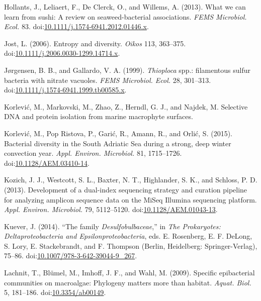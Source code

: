\documentclass[12pt,]{article}
\begin{document}
\leavevmode\hypertarget{ref-Hollants2013}{}%
Hollants, J., Leliaert, F., De Clerck, O., and Willems, A. (2013). What
we can learn from sushi: A review on seaweed-bacterial associations.
\emph{FEMS Microbiol. Ecol.} 83.
doi:\href{https://doi.org/10.1111/j.1574-6941.2012.01446.x}{10.1111/j.1574-6941.2012.01446.x}.

\leavevmode\hypertarget{ref-Jost2006}{}%
Jost, L. (2006). Entropy and diversity. \emph{Oikos} 113, 363--375.
doi:\href{https://doi.org/10.1111/j.2006.0030-1299.14714.x}{10.1111/j.2006.0030-1299.14714.x}.

\leavevmode\hypertarget{ref-Jorgensen1999}{}%
Jørgensen, B. B., and Gallardo, V. A. (1999). \emph{Thioploca} spp.:
filamentous sulfur bacteria with nitrate vacuoles. \emph{FEMS Microbiol.
Ecol.} 28, 301--313.
doi:\href{https://doi.org/10.1111/j.1574-6941.1999.tb00585.x}{10.1111/j.1574-6941.1999.tb00585.x}.

\leavevmode\hypertarget{ref-Korlevic}{}%
Korlević, M., Markovski, M., Zhao, Z., Herndl, G. J., and Najdek, M.
Selective DNA and protein isolation from marine macrophyte surfaces.

\leavevmode\hypertarget{ref-Korlevic2015}{}%
Korlević, M., Pop Ristova, P., Garić, R., Amann, R., and Orlić, S.
(2015). Bacterial diversity in the South Adriatic Sea during a strong,
deep winter convection year. \emph{Appl. Environ. Microbiol.} 81,
1715--1726.
doi:\href{https://doi.org/10.1128/AEM.03410-14}{10.1128/AEM.03410-14}.

\leavevmode\hypertarget{ref-Kozich2013}{}%
Kozich, J. J., Westcott, S. L., Baxter, N. T., Highlander, S. K., and
Schloss, P. D. (2013). Development of a dual-index sequencing strategy
and curation pipeline for analyzing amplicon sequence data on the MiSeq
Illumina sequencing platform. \emph{Appl. Environ. Microbiol.} 79,
5112--5120.
doi:\href{https://doi.org/10.1128/AEM.01043-13}{10.1128/AEM.01043-13}.

\leavevmode\hypertarget{ref-Kuever2014}{}%
Kuever, J. (2014). ``The family \emph{Desulfobulbaceae},'' in \emph{The
Prokaryotes: Deltaproteobacteria and Epsilonproteobacteria}, eds. E.
Rosenberg, E. F. DeLong, S. Lory, E. Stackebrandt, and F. Thompson
(Berlin, Heidelberg: Springer-Verlag), 75--86.
doi:\href{https://doi.org/10.1007/978-3-642-39044-9_267}{10.1007/978-3-642-39044-9\_267}.

\leavevmode\hypertarget{ref-Lachnit2009}{}%
Lachnit, T., Blümel, M., Imhoff, J. F., and Wahl, M. (2009). Specific
epibacterial communities on macroalgae: Phylogeny matters more than
habitat. \emph{Aquat. Biol.} 5, 181--186.
doi:\href{https://doi.org/10.3354/ab00149}{10.3354/ab00149}.
\end{document}
